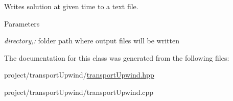 Writes solution at given time to a text file. 
\begin{DoxyParams}{Parameters}
\item[{\em directory,:}]folder path where output files will be written \end{DoxyParams}


The documentation for this class was generated from the following files:\begin{DoxyCompactItemize}
\item 
project/transportUpwind/\hyperlink{transportUpwind_8hpp}{transportUpwind.hpp}\item 
project/transportUpwind/transportUpwind.cpp\end{DoxyCompactItemize}
